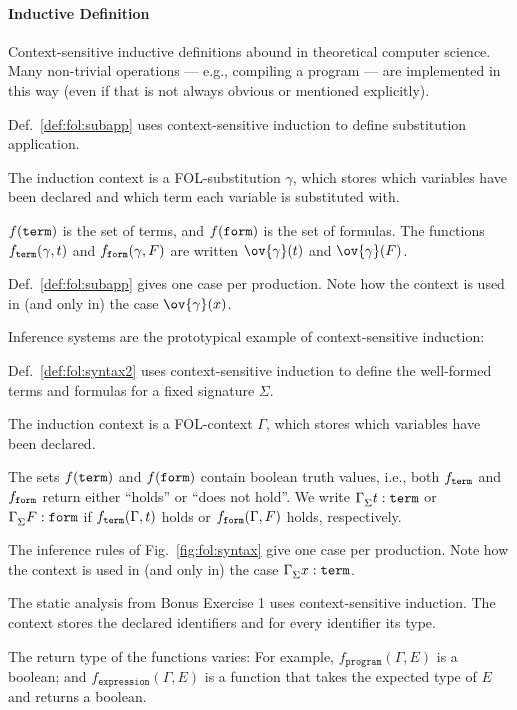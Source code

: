 \paragraph{Inductive Definition}

Context-sensitive inductive definitions abound in theoretical computer science.
Many non-trivial operations --- e.g., compiling a program --- are implemented in this way (even if that is not always obvious or mentioned explicitly).

\begin{example}[Substitution]
Def.~\ref{def:fol:subapp} uses context-sensitive induction to define substitution application.

The induction context is a FOL-substitution $\gamma$, which stores which variables have been declared and which term each variable is substituted with.

$f(\mathtt{term})$ is the set of terms, and $f(\mathtt{form})$ is the set of formulas.
The functions $f_{\mathtt{term}}(\gamma,t)$ and $f_{\mathtt{form}}(\gamma,F)$ are written $\ov{\gamma}(t)$ and $\ov{\gamma}(F)$.

Def.~\ref{def:fol:subapp} gives one case per production.
Note how the context is used in (and only in) the case $\ov{\gamma}(x)$.
\end{example}

Inference systems are the prototypical example of context-sensitive induction:

\begin{example}
Def.~\ref{def:fol:syntax2} uses context-sensitive induction to define the well-formed terms and formulas for a fixed signature $\Sigma$.

The induction context is a FOL-context $\Gamma$, which stores which variables have been declared.

The sets $f(\mathtt{term})$ and $f(\mathtt{form})$ contain boolean truth values, i.e., both $f_{\mathtt{term}}$ and $f_{\mathtt{form}}$ return either ``holds'' or ``does not hold''.
We write $\Gamma^{}_{\Sigma}t:\mathtt{term}$ or $\Gamma^{}_{\Sigma}F:\mathtt{form}$ if $f_{\mathtt{term}}(\Gamma,t)$ holds or $f_{\mathtt{form}}(\Gamma,F)$ holds, respectively.

The inference rules of Fig.~\ref{fig:fol:syntax} give one case per production.
Note how the context is used in (and only in) the case $\Gamma^{}_{\Sigma}x:\mathtt{term}$.
\end{example}

\begin{example}
The static analysis from Bonus Exercise 1 uses context-sensitive induction.
The context stores the declared identifiers and for every identifier its type.

The return type of the functions varies: For example, $f_{\mathtt{program}}(\Gamma,E)$ is a boolean; and $f_{\mathtt{expression}}(\Gamma,E)$ is a function that takes the expected type of $E$ and returns a boolean.
\end{example}

